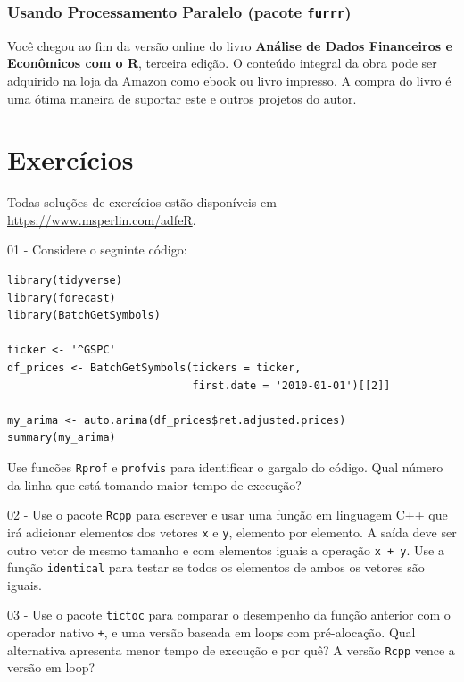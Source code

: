 \documentclass[
  11pt,
]{book}
\newenvironment{pleasebuyit}
{\begin{noteblock}
		
	} {\end{noteblock}}
\begin{document}
\hypertarget{usando-processamento-paralelo-pacote-furrr}{%
\subsubsection{\texorpdfstring{Usando Processamento Paralelo (pacote \texttt{furrr})}{Usando Processamento Paralelo (pacote furrr)}}\label{usando-processamento-paralelo-pacote-furrr}}

\begin{pleasebuyit}
Você chegou ao fim da versão online do livro \textbf{Análise de Dados
Financeiros e Econômicos com o R}, terceira edição. O conteúdo integral
da obra pode ser adquirido na loja da Amazon como
\href{https://www.amazon.com.br/dp/B08WNC27ZY}{ebook} ou
\href{https://www.amazon.com/dp/B08WP8CCDB}{livro impresso}. A compra do
livro é uma ótima maneira de suportar este e outros projetos do autor.
\end{pleasebuyit}

\hypertarget{exercuxedcios-1}{%
\section{Exercícios}\label{exercuxedcios-1}}

Todas soluções de exercícios estão disponíveis em \url{https://www.msperlin.com/adfeR}.

01 -
Considere o seguinte código:

\begin{verbatim}
library(tidyverse)
library(forecast)
library(BatchGetSymbols)

ticker <- '^GSPC'
df_prices <- BatchGetSymbols(tickers = ticker, 
                             first.date = '2010-01-01')[[2]]

my_arima <- auto.arima(df_prices$ret.adjusted.prices)
summary(my_arima)
\end{verbatim}

Use funcões \texttt{Rprof} e \texttt{profvis} para identificar o gargalo do código. Qual número da linha que está tomando maior tempo de execução?

02 -
Use o pacote \texttt{Rcpp} para escrever e usar uma função em linguagem C++ que irá adicionar elementos dos vetores \texttt{x} e \texttt{y}, elemento por elemento. A saída deve ser outro vetor de mesmo tamanho e com elementos iguais a operação \texttt{x\ +\ y}. Use a função \texttt{identical} para testar se todos os elementos de ambos os vetores são iguais.

03 -
Use o pacote \texttt{tictoc} para comparar o desempenho da função anterior com o operador nativo \texttt{+}, e uma versão baseada em loops com pré-alocação. Qual alternativa apresenta menor tempo de execução e por quê? A versão \texttt{Rcpp} vence a versão em loop?
\end{document}
